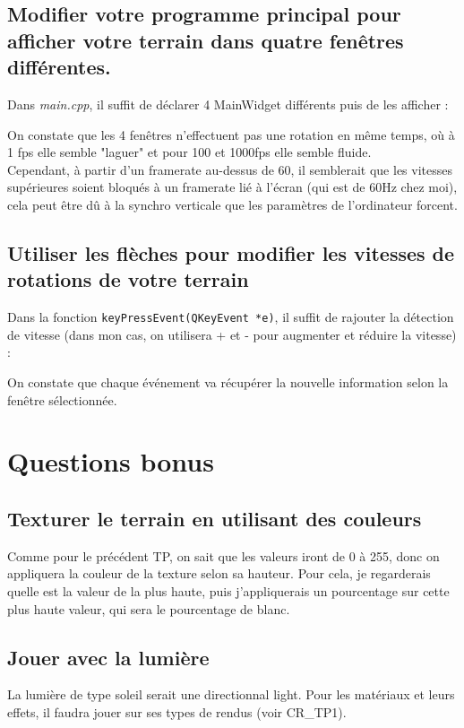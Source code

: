 \documentclass[a4paper,11pt]{report}
\begin{document}
	\subsection{Modifier votre programme principal pour afficher votre terrain dans quatre fenêtres différentes.}
	Dans \textit{main.cpp}, il suffit de déclarer 4 MainWidget différents puis de les afficher :
			
	On constate que les 4 fenêtres n'effectuent pas une rotation en même temps, où à 1 fps elle semble "laguer" et pour 100 et 1000fps elle semble fluide. \\
	Cependant, à partir d'un framerate au-dessus de 60, il semblerait que les vitesses supérieures soient bloqués à un framerate lié à l'écran (qui est de 60Hz chez moi), cela peut être dû à la synchro verticale que les paramètres de l'ordinateur forcent.
	
	\subsection{Utiliser les flèches pour modifier les vitesses de rotations de votre terrain}
	Dans la fonction \texttt{keyPressEvent(QKeyEvent *e)}, il suffit de rajouter la détection de vitesse (dans mon cas, on utilisera + et - pour augmenter et réduire la vitesse) :
	
	On constate que chaque événement va récupérer la nouvelle information selon la fenêtre sélectionnée.
    
    \pagebreak
    \section{Questions bonus}
    \subsection{Texturer le terrain en utilisant des couleurs}
    Comme pour le précédent TP, on sait que les valeurs iront de 0 à 255, donc on appliquera la couleur de la texture selon sa hauteur. Pour cela, je regarderais quelle est la valeur de la plus haute, puis j'appliquerais un pourcentage sur cette plus haute valeur, qui sera le pourcentage de blanc.
    
    \subsection{Jouer avec la lumière}
    La lumière de type soleil serait une directionnal light. Pour les matériaux et leurs effets, il faudra jouer sur ses types de rendus (voir CR\_TP1).
\end{document}
